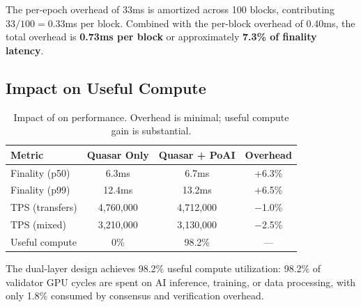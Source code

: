 The per-epoch overhead of 33ms is amortized across 100 blocks, contributing $33/100 = 0.33$ms per block. Combined with the per-block overhead of 0.40ms, the total \PoAI{} overhead is \textbf{0.73ms per block} or approximately \textbf{7.3\% of \Quasar{} finality latency}.

\subsection{Impact on Useful Compute}

\begin{table}[t]
\centering
\begin{tabular}{lccc}
\toprule
\textbf{Metric} & \textbf{Quasar Only} & \textbf{Quasar + PoAI} & \textbf{Overhead} \\
\midrule
Finality (p50) & 6.3ms & 6.7ms & +6.3\% \\
Finality (p99) & 12.4ms & 13.2ms & +6.5\% \\
TPS (transfers) & 4,760,000 & 4,712,000 & $-$1.0\% \\
TPS (mixed) & 3,210,000 & 3,130,000 & $-$2.5\% \\
Useful compute & 0\% & 98.2\% & --- \\
\bottomrule
\end{tabular}
\caption{Impact of \PoAI{} on \Quasar{} performance. Overhead is minimal; useful compute gain is substantial.}
\label{tab:useful}
\end{table}

The dual-layer design achieves 98.2\% useful compute utilization: 98.2\% of validator GPU cycles are spent on AI inference, training, or data processing, with only 1.8\% consumed by consensus and verification overhead.

